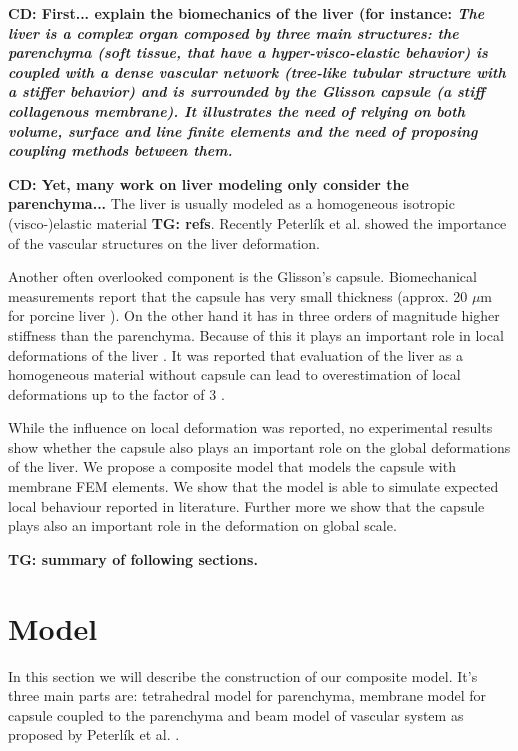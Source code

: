 \documentclass{llncs}
\newcommand{\TG}[1]{{\color{blue}\textbf{TG: #1}}}
\newcommand{\CD}[1]{{\color{green}\textbf{CD: #1}}}
\begin{document}
\CD{First... explain the biomechanics of the liver (for instance: 
\textit{
The liver is a complex organ composed by three main structures: the parenchyma (soft tissue, that have a hyper-visco-elastic behavior) is coupled with a dense vascular network (tree-like tubular structure with a stiffer behavior) and is surrounded by the Glisson capsule  (a stiff collagenous membrane).
It illustrates the need of relying on both volume, surface and line finite elements and the need of proposing coupling methods between them.}
 }

\CD{Yet, many work on liver modeling only consider the parenchyma...}
The liver is usually modeled as a homogeneous isotropic (visco-)elastic
material \TG{refs}.%
Recently
Peterl\'{i}k et al. \cite{Peterlik2012} showed the importance of the vascular
structures on the liver deformation.

Another often overlooked component is the Glisson's capsule.
Biomechanical measurements report that the capsule has very small
thickness (approx. 20 $\mu$m for porcine liver \cite{Umale2011}).
On the other hand it has in three orders of magnitude higher stiffness than
the parenchyma.
Because of this it plays an important role in local
deformations of the liver \cite{Ahn2010,Hollenstein2006}.
It was reported that evaluation of the liver as a homogeneous material
without capsule can lead to overestimation of local deformations up to the factor of 3
\cite{Hollenstein2006}.

While the influence on local deformation was reported, no experimental
results show whether the capsule also plays an important role on the global
deformations of the liver. We propose a composite model that models the
capsule with membrane FEM elements. We show that the model is able to
simulate expected local behaviour reported in literature. Further more we
show that the capsule plays also an important role in the deformation on
global scale.

\TG{summary of following sections.}



\section{Model} %

In this section we will describe the construction of our composite model.
It's three main parts are: tetrahedral model for parenchyma, membrane model
for capsule coupled to the parenchyma and beam model of vascular system as
proposed by Peterl\'{i}k et al. \cite{Peterlik2012}.
\end{document}
